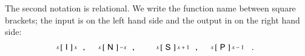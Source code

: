 \begin{definition}
\begin{itemize}
The second notation is relational. We write the function name between square brackets;
the input is on the left hand side and the output in on the right hand side:
\begin{align*}
\arraycolsep=1.4pt
\begin{array}{rcl}
 \left. {\scriptsize \begin{array}{r} 
                       x
                     \end{array}} \right[
 & \rprId &
 \left] {\scriptsize \begin{array}{l}
                       x
                     \end{array} } \right. \;,
\end{array}
&&&
\arraycolsep=1.4pt
\begin{array}{rcl}
 \left. {\scriptsize \begin{array}{r} 
                       x
                     \end{array}} \right[
 & \rprNeg &
 \left] {\scriptsize \begin{array}{l}
                       -x
                     \end{array} } \right. \;,
\end{array}
&&&
\arraycolsep=1.4pt
\begin{array}{rcl}
 \left. {\scriptsize \begin{array}{r} 
                       x
                     \end{array}} \right[
 & \rprSucc &
 \left] {\scriptsize \begin{array}{l}
                       x+1
                     \end{array} } \right. \;,
\end{array}
&&&
\arraycolsep=1.4pt
\begin{array}{rcl}
 \left. {\scriptsize \begin{array}{r} 
                       x
                     \end{array}} \right[
 & \rprPred &
 \left] {\scriptsize \begin{array}{l}
                       x-1
                     \end{array} } \right.
\end{array}
\enspace .
\end{align*}


\end{itemize}
\end{definition}
